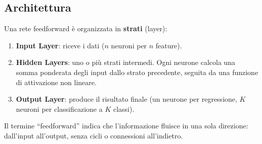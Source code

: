 \documentclass[12pt,a4paper]{article}
\begin{document}
\subsection{Architettura}

Una rete feedforward \`e organizzata in \textbf{strati} (layer):
\begin{enumerate}
    \item \textbf{Input Layer}: riceve i dati ($n$ neuroni per $n$ feature).
    \item \textbf{Hidden Layers}: uno o pi\`u strati intermedi. Ogni neurone calcola una somma ponderata degli input dallo strato precedente, seguita da una funzione di attivazione non lineare.
    \item \textbf{Output Layer}: produce il risultato finale (un neurone per regressione, $K$ neuroni per classificazione a $K$ classi).
\end{enumerate}

Il termine ``feedforward'' indica che l'informazione fluisce in una sola direzione: dall'input all'output, senza cicli o connessioni all'indietro.
\end{document}
